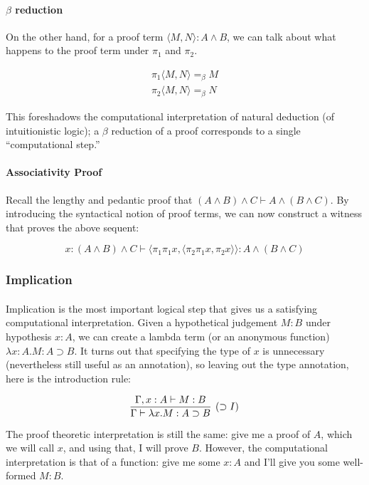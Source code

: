 \documentclass[a4paper]{article}
\begin{document}
\paragraph{$\beta$ reduction}
On the other hand, for a proof term $\langle M, N \rangle : A \land B$, we can talk about what
happens to the proof term under $\pi_1$ and $\pi_2$.

\begin{gather*}
  \pi_1 \langle M, N \rangle =_{\beta} M \\
  \pi_2 \langle M, N \rangle =_{\beta} N
\end{gather*}

This foreshadows the computational interpretation of natural deduction (of
intuitionistic logic); a $\beta$ reduction of a proof corresponds to a single
``computational step.''

\paragraph{Associativity Proof}
Recall the lengthy and pedantic proof that $(A \land B) \land C \vdash A \land
(B \land C)$. By introducing the syntactical notion of proof terms, we can now
construct a witness that proves the above sequent:

$$x : (A \land B) \land C \vdash \langle \pi_1 \pi_1 x, \langle \pi_2 \pi_1 x,
\pi_2 x \rangle \rangle : A \land (B \land C)$$


\subsubsection{Implication}
\paragraph{}
Implication is the most important logical step that gives us a satisfying
computational interpretation.  Given a hypothetical judgement $M : B$ under
hypothesis $x : A$, we can create a lambda term (or an anonymous function)
$\lambda x:A. M : A \supset B$. It turns out that specifying the type of $x$ is
unnecessary (nevertheless still useful as an annotation), so leaving out the
type annotation, here is the introduction rule:

$$\infer[(\supset I)]{\Gamma \vdash \lambda x.M : A \supset B}{\Gamma, x:A
\vdash M : B}$$

The proof theoretic interpretation is still the same: give me a proof of $A$,
which we will call $x$, and using that, I will prove $B$. However, the
computational interpretation is that of a function: give me some $x : A$ and
I'll give you some well-formed $M : B$.
\end{document}
